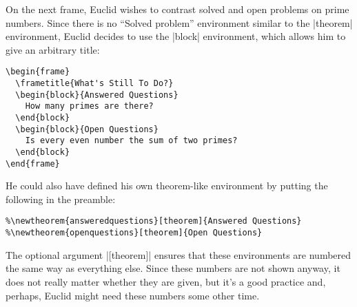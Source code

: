 On the next frame, Euclid wishes to contrast solved and open problems
on prime numbers. Since there is no ``Solved problem'' environment
similar to the |theorem| environment, Euclid decides to use the
|block| environment, which allows him to give an arbitrary title:
\begin{verbatim}
\begin{frame}
  \frametitle{What's Still To Do?}
  \begin{block}{Answered Questions}
    How many primes are there?
  \end{block}
  \begin{block}{Open Questions}
    Is every even number the sum of two primes?
  \end{block}
\end{frame}
\end{verbatim}
He could also have defined his own theorem-like environment by putting
the following in the preamble:
\begin{verbatim} 
%\newtheorem{answeredquestions}[theorem]{Answered Questions}
%\newtheorem{openquestions}[theorem]{Open Questions}
\end{verbatim}
The optional argument |[theorem]| ensures that these environments are 
numbered the same way as everything else. Since these numbers are not
shown anyway, it does not really matter whether they are given, but
it's a good practice and, perhaps, Euclid might need these numbers
some other time.

